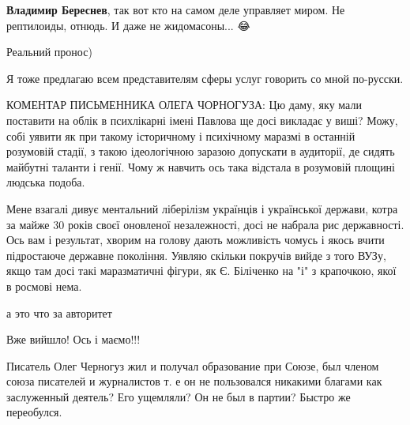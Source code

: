 \begin{itemize}
\begin{itemize}
\textbf{Владимир Береснев}, так вот кто на самом деле управляет миром. Не рептилоиды, отнюдь. И даже не жидомасоны... 😂
\end{itemize}


Реальний пронос)


Я тоже предлагаю всем представителям сферы услуг говорить со мной по-русски.



КОМЕНТАР ПИСЬМЕННИКА ОЛЕГА ЧОРНОГУЗА: Цю даму, яку мали поставити на облік в
психлікарні імені Павлова ще досі викладає у виші? Можу, собі уявити як при
такому історичному і психічному маразмі в останній розумовій стадії, з такою
ідеологічною заразою допускати в аудиторії, де сидять майбутні таланти і генії.
Чому ж навчить ось така відстала в розумовій площині людська подоба.

Мене взагалі дивує ментальний ліберілізм українців і української держави, котра
за майже 30 років своєї оновленої незалежності, досі не набрала рис
державності. Ось вам і результат, хворим на голову дають можливість чомусь і
якось вчити підростаюче державне покоління. Уявляю скільки покручів вийде з
того ВУЗу, якщо там досі такі маразматичні фігури, як Є. Біліченко на "і" з
крапочкою, якої в росмові нема.

\begin{itemize}

а это что за авторитет


Вже вийшло! Ось і маємо!!!


Писатель Олег Черногуз жил и получал образование при Союзе, был членом союза
писателей и журналистов т. е он не пользовался никакими благами как заслуженный
деятель? Его ущемляли? Он не был в партии? Быстро же переобулся.
\end{itemize}


\end{itemize}
